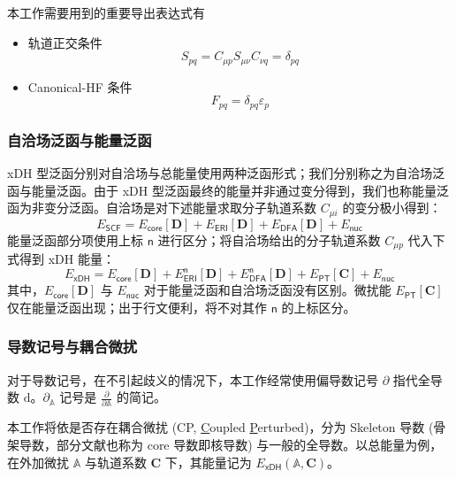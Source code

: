 本工作需要用到的重要导出表达式有
\begin{itemize}[nosep]
  \item 轨道正交条件
        \begin{equation}
          S_{pq} = C_{\mu p} S_{\mu \nu} C_{\nu q} = \delta_{pq}
        \end{equation}
  \item Canonical-HF 条件
        \begin{equation}
          F_{pq} = \delta_{pq} \varepsilon_p
        \end{equation}
\end{itemize}

\subsubsection{自洽场泛函与能量泛函}

xDH 型泛函分别对自洽场与总能量使用两种泛函形式；我们分别称之为\textsf{自洽场泛函}与\textsf{能量泛函}。由于 xDH 型泛函最终的能量并非通过变分得到，我们也称能量泛函为非变分泛函。自洽场是对下述能量求取分子轨道系数 $C_{\mu i}$ 的变分极小得到：
\begin{equation}
  E_\textsf{SCF} = E_\textsf{core} [\mathbf{D}] + E_\textsf{ERI} [\mathbf{D}] + E_\textsf{DFA} [\mathbf{D}] + E_\textsf{nuc}
\end{equation}
能量泛函部分项使用上标 $\textsf{n}$ 进行区分；将自洽场给出的分子轨道系数 $C_{\mu p}$ 代入下式得到 xDH 能量：
\begin{equation}
  E_\textsf{xDH} = E_\textsf{core} [\mathbf{D}] + E_\textsf{ERI}^\textsf{n} [\mathbf{D}] + E_\textsf{DFA}^\textsf{n} [\mathbf{D}] + E_\textsf{PT} [\mathbf{C}] + E_\textsf{nuc}
\end{equation}
其中，$E_\textsf{core} [\mathbf{D}]$ 与 $E_\textsf{nuc}$ 对于能量泛函和自洽场泛函没有区别。微扰能 $E_\textsf{PT} [\mathbf{C}]$ 仅在能量泛函出现；出于行文便利，将不对其作 $\textsf{n}$ 的上标区分。

\subsubsection{导数记号与耦合微扰}

对于导数记号，在不引起歧义的情况下，本工作经常使用偏导数记号 $\partial$ 指代全导数 $\mathrm{d}$。$\partial_\mathbb{A}$ 记号是 $\frac{\partial}{\partial \mathbb{A}}$ 的简记。

本工作将依是否存在耦合微扰 (CP, \underline{C}oupled \underline{P}erturbed)，分为 Skeleton 导数 (骨架导数，部分文献也称为 core 导数即核导数) 与一般的全导数。以总能量为例，在外加微扰 $\mathbb{A}$ 与轨道系数 $\mathbf{C}$ 下，其能量记为 $E_\textsf{xDH} (\mathbb{A}, \mathbf{C})$。

